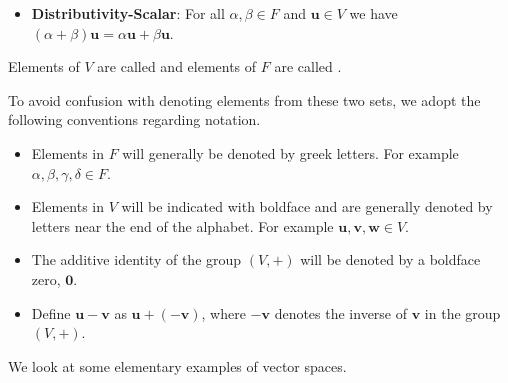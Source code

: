 \begin{definition}
\begin{itemize}
        \item \textbf{Distributivity-Scalar}: For all $\alpha, \beta \in F$ and $\mathbf{u} \in V$ we have $(\alpha+\beta)\mathbf{u} = \alpha\mathbf{u} + \beta\mathbf{u}$.
    \end{itemize}
    Elements of $V$ are called  and elements of $F$ are called .
\end{definition}

To avoid confusion with denoting elements from these two sets, we adopt the following conventions regarding notation.
\begin{itemize}
    \item Elements in $F$ will generally be denoted by greek letters. For example $\alpha, \beta, \gamma, \delta \in F$.
    \item Elements in $V$ will be indicated with boldface and are generally denoted by letters near the end of the alphabet. For example $\mathbf{u}, \mathbf{v}, \mathbf{w} \in V$.
    \item The additive identity of the group $(V, +)$ will be denoted by a boldface zero, $\mathbf{0}$.
    \item Define $\mathbf{u} - \mathbf{v}$ as $\mathbf{u} + (-\mathbf{v})$, where $-\mathbf{v}$ denotes the inverse of $\mathbf{v}$ in the group $(V, +)$.
\end{itemize}

We look at some elementary examples of vector spaces.

